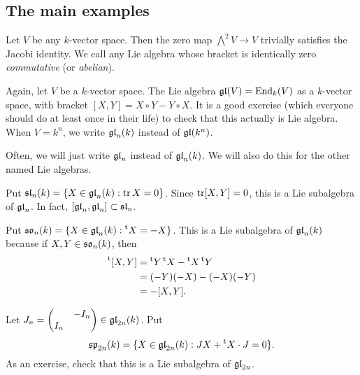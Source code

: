 \subsection{The main examples}

\begin{example}
Let $V$ be any $k$-vector space. Then the zero map $\bigwedge^2 V\to V$ 
trivially satisfies the Jacobi identity. We call any Lie algebra whose 
bracket is identically zero \emph{commutative} (or \emph{abelian}). 
\end{example}

\begin{example}
Again, let $V$ be a $k$-vector space. The Lie algebra $\mathfrak{gl}(V)=\operatorname{End}_k(V)$ as a 
$k$-vector space, with bracket $[X,Y]=X\circ Y-Y\circ X$. It is a good exercise 
(which everyone should do at least once in their life) to check that this 
actually is Lie algebra. When $V=k^n$, we write $\mathfrak{gl}_n(k)$ instead of 
$\mathfrak{gl}(k^n)$. 
\end{example}

Often, we will just write $\mathfrak{gl}_n$ instead of $\mathfrak{gl}_n(k)$. We will also do this 
for the other named Lie algebras. 

\begin{example}
Put $\mathfrak{sl}_n(k)=\{X\in \mathfrak{gl}_n(k):\operatorname{tr} X=0\}$. Since $\operatorname{tr} [X,Y]=0$, this is a 
Lie subalgebra of $\mathfrak{gl}_n$. In fact, $[\mathfrak{gl}_n,\mathfrak{gl}_n]\subset \mathfrak{sl}_n$. 
\end{example}

\begin{example}
Put $\mathfrak{so}_n(k) = \{X\in \mathfrak{gl}_n(k):\prescript{\mathrm{t}}{}{X}=-X\}$. This is a Lie subalgebra 
of $\mathfrak{gl}_n(k)$ because if $X,Y\in \mathfrak{so}_n(k)$, then 
\begin{align*}
  \prescript{\mathrm{t}}{}{[X,Y]} 
    &= \prescript{\mathrm{t}}{}{Y} \prescript{\mathrm{t}}{}{X}-\prescript{\mathrm{t}}{}{X} \prescript{\mathrm{t}}{}{Y} \\
    &= (-Y)(-X) - (-X)(-Y) \\
    &= -[X,Y] .
\end{align*}
\end{example}

\begin{example}[Symplectic]
Let $J_n=\begin{pmatrix} & -I_n \\ I_n \end{pmatrix}\in \mathfrak{gl}_{2n}(k)$. Put 
\[
  \mathfrak{sp}_{2n}(k) = \{X\in \mathfrak{gl}_{2n}(k):J X+\prescript{\mathrm{t}}{}{X}\cdot J=0\} .
\]
As an exercise, check that this is a Lie subalgebra of $\mathfrak{gl}_{2n}$. 
\end{example}

